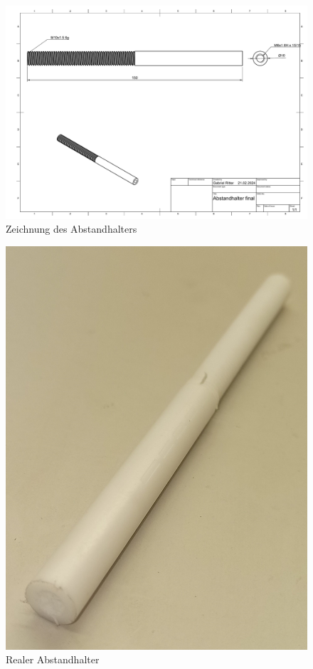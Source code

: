 \begin{figure}[h!]
	\centering
	\includegraphics[width=\textwidth]{../ref/Abstandhalter final Zeichnung v2.pdf}
	\caption{Zeichnung des Abstandhalters}
	\label{fig:Abstandhalter-Zeichnung}
\end{figure}

\begin{figure}[h!]
	\centering
	\includegraphics[width=\textwidth]{../ref/Abstandhalter-real.jpg}
	\caption{Realer Abstandhalter}
	\label{fig:Abstandhalter-real}
\end{figure}

